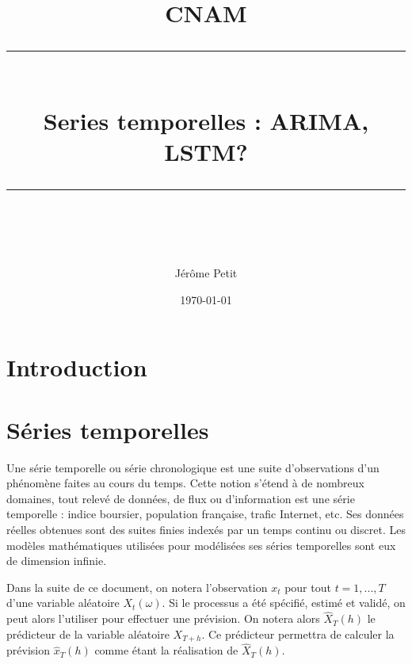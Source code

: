 \documentclass[11pt]{scrartcl} %
\title{	
	\normalfont\normalsize
	\textsc{CNAM}\\ %
	\vspace{25pt} %
	\rule{\linewidth}{0.5pt}\\ %
	\vspace{20pt} %
	{\huge Series temporelles : ARIMA, LSTM?}\\ %
	\vspace{12pt} %
	\rule{\linewidth}{2pt}\\ %
	\vspace{12pt} %
}
\author{\LARGE Jérôme Petit} %
\date{\normalsize\today} %
\begin{document}
\maketitle %

%
\section{Introduction}


\section{Séries temporelles}
Une série temporelle ou série chronologique est une suite d'observations d’un phénomène faites au cours du temps. Cette notion s'étend à de nombreux domaines, tout relevé de données, de flux ou d'information est une série temporelle : indice boursier, population française, trafic Internet, etc. Ses données réelles obtenues sont des suites finies indexés par un temps continu ou discret. Les modèles mathématiques utilisées pour modélisées ses séries temporelles sont eux de dimension infinie.


Dans la suite de ce document, on notera l'observation $x_t$ pour tout $t=1,...,T$ d'une variable aléatoire $X_t(\omega)$. Si le processus a été spécifié, estimé et validé, on peut alors l'utiliser pour effectuer une prévision. On notera alors $\hat{X}_T(h)$ le prédicteur de la variable aléatoire $X_{T+h}$. Ce prédicteur permettra de calculer la prévision $\hat{x}_T(h)$ comme étant la réalisation de $\hat{X}_T(h)$. 
\end{document}
